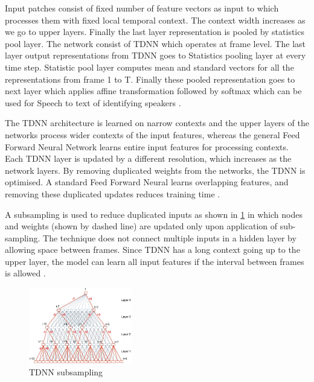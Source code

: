 
Input patches consist of fixed number of feature vectors as input to which processes them with fixed local temporal context. The context width increases as we go to upper layers. Finally the last layer representation is pooled by statistics pool layer. The network consist of TDNN which operates at frame level. The last layer output representations from TDNN goes to Statistics pooling layer at every time step. Statistic pool layer computes mean and standard vectors for all the representations from frame 1 to T. Finally these pooled representation goes to next layer which applies affine transformation followed by softmax which can be used for Speech to text of identifying speakers \cite{liu_time_2019}. 

The TDNN architecture is learned on narrow contexts and the upper layers of the networks process wider contexts of the input features, whereas the general Feed Forward Neural Network learns entire input features for processing contexts. Each TDNN layer is updated by a different resolution, which increases as the network layers. By removing duplicated weights from the networks, the TDNN is optimised. A standard Feed Forward Neural learns overlapping features, and removing these duplicated updates reduces training time \cite{yeh_taiwanese_2020}. 

A subsampling is used to reduce duplicated inputs as shown in \ref{fig:tdnn-subsampling} in which nodes and weights (shown by dashed line) are updated only upon application of sub-sampling. The technique does not connect multiple inputs in a hidden layer by allowing space between frames. Since TDNN has a long context going up to the upper layer, the model can learn all input features if the interval between frames is allowed \cite{ritter_neural_2019}. 

\begin{figure}[h!]
    \centering
    \includegraphics[width=0.40\textwidth]{img/Tdnn-subsampling.jpg}
    \caption{TDNN subsampling \cite{ritter_neural_2019}}
    \label{fig:tdnn-subsampling}
\end{figure}

